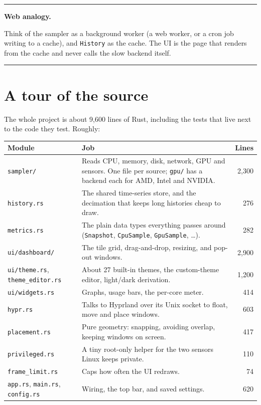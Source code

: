 \documentclass[11pt,a4paper]{article}
\newcommand{\code}[1]{\texttt{#1}}
\newcommand{\file}[1]{\texttt{#1}}
\newenvironment{callout}[1]{%
  \par\medskip\noindent\hrule\vspace{0.4em}\noindent\small\textbf{#1.}\ \ignorespaces
}{%
  \par\vspace{0.3em}\noindent\hrule\medskip
}
\begin{document}
\begin{callout}{Web analogy}
Think of the sampler as a background worker (a web worker, or a cron job writing to a cache),
and \code{History} as the cache. The UI is the page that renders from the cache and never
calls the slow backend itself.
\end{callout}

\section{A tour of the source}

The whole project is about 9,600 lines of Rust, including the tests that live next to the code
they test. Roughly:

\begin{center}
\small
\begin{tabular}{@{}p{3.6cm}p{9.6cm}r@{}}
\toprule
Module & Job & Lines \\
\midrule
\file{sampler/} & Reads CPU, memory, disk, network, GPU and sensors. One file per source; \file{gpu/} has a backend each for AMD, Intel and NVIDIA. & 2,300 \\
\file{history.rs} & The shared time-series store, and the decimation that keeps long histories cheap to draw. & 276 \\
\file{metrics.rs} & The plain data types everything passes around (\code{Snapshot}, \code{CpuSample}, \code{GpuSample}, \dots). & 282 \\
\file{ui/dashboard/} & The tile grid, drag-and-drop, resizing, and pop-out windows. & 2,900 \\
\file{ui/theme.rs}, \file{theme\_editor.rs} & About 27 built-in themes, the custom-theme editor, light/dark derivation. & 1,200 \\
\file{ui/widgets.rs} & Graphs, usage bars, the per-core meter. & 414 \\
\file{hypr.rs} & Talks to Hyprland over its Unix socket to float, move and place windows. & 603 \\
\file{placement.rs} & Pure geometry: snapping, avoiding overlap, keeping windows on screen. & 417 \\
\file{privileged.rs} & A tiny root-only helper for the two sensors Linux keeps private. & 110 \\
\file{frame\_limit.rs} & Caps how often the UI redraws. & 74 \\
\file{app.rs}, \file{main.rs}, \file{config.rs} & Wiring, the top bar, and saved settings. & 620 \\
\bottomrule
\end{tabular}
\end{center}
\end{document}
